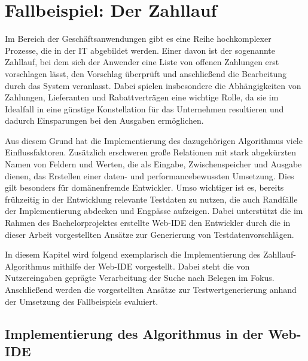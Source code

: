 \section{Fallbeispiel: Der Zahllauf}\label{chap:paymentrun}

Im Bereich der Geschäftsanwendungen gibt es eine Reihe hochkomplexer Prozesse, die in der IT abgebildet werden.
Einer davon ist der sogenannte Zahllauf, bei dem sich der Anwender eine Liste von offenen Zahlungen erst vorschlagen lässt, den Vorschlag überprüft und anschließend die Bearbeitung durch das System veranlasst.
Dabei spielen insbesondere die Abhängigkeiten von Zahlungen, Lieferanten und Rabattverträgen eine wichtige Rolle, da sie im Idealfall in eine günstige Konstellation für das Unternehmen resultieren und dadurch Einsparungen bei den Ausgaben ermöglichen.

Aus diesem Grund hat die Implementierung des dazugehörigen Algorithmus viele Einflussfaktoren. 
Zusätzlich erschweren große Relationen mit stark abgekürzten Namen von Feldern und Werten, die als Eingabe, Zwischenspeicher und Ausgabe dienen, das Erstellen einer daten- und performancebewussten Umsetzung.
Dies gilt besonders für domänenfremde Entwickler.
Umso wichtiger ist es, bereits frühzeitig in der Entwicklung relevante Testdaten zu nutzen, die auch Randfälle der Implementierung abdecken und Engpässe aufzeigen.
Dabei unterstützt die im Rahmen des Bachelorprojektes erstellte Web-IDE den Entwickler durch die in dieser Arbeit vorgestellten Ansätze zur Generierung von Testdatenvorschlägen.

In diesem Kapitel wird folgend exemplarisch die Implementierung des Zahllauf-Algorithmus mithilfe der Web-IDE vorgestellt.
Dabei steht die von Nutzereingaben geprägte Verarbeitung der Suche nach Belegen im Fokus.
Anschließend werden die vorgestellten Ansätze zur Testwertgenerierung anhand der Umsetzung des Fallbeispiels evaluiert.

\subsection{Implementierung des Algorithmus in der Web-IDE}

